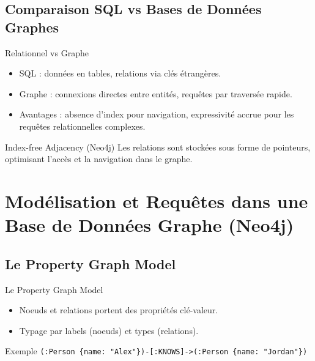 \documentclass{beamer}
\begin{document}
\subsection{Comparaison SQL vs Bases de Données Graphes}
\begin{frame}{Relationnel vs Graphe}
  \begin{itemize}
    \item SQL : données en tables, relations via clés étrangères.
    \item Graphe : connexions directes entre entités, requêtes par traversée rapide.
    \item Avantages : absence d’index pour navigation, expressivité accrue pour les requêtes relationnelles complexes.
  \end{itemize}
  \begin{block}{Index-free Adjacency (Neo4j)}
    Les relations sont stockées sous forme de pointeurs, optimisant l’accès et la navigation dans le graphe.
  \end{block}
\end{frame}

\section{Modélisation et Requêtes dans une Base de Données Graphe (Neo4j)}
\subsection{Le Property Graph Model}
\begin{frame}{Le Property Graph Model}
  \begin{itemize}
    \item Noeuds et relations portent des propriétés clé-valeur.
    \item Typage par labels (noeuds) et types (relations).
  \end{itemize}
  \begin{block}{Exemple}
    \texttt{(:Person \{name: "Alex"\})-[:KNOWS]->(:Person \{name: "Jordan"\})}
  \end{block}
\end{frame}
\end{document}
